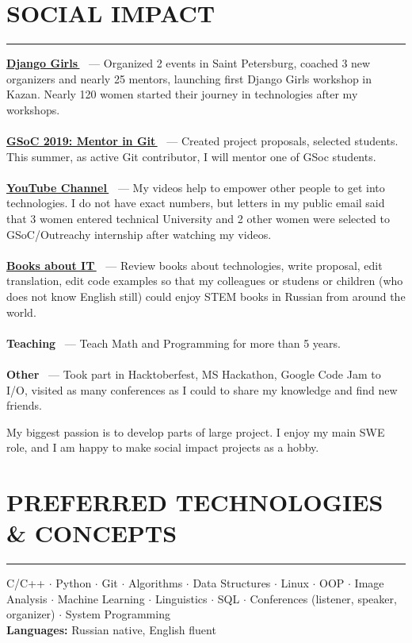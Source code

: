 \documentclass[11pt]{res} %
\let\orighref\href
\renewcommand{\href}[2]{\orighref{#1}{#2\,\faExternalLink}}
\begin{document}
\begin{resume}
\section{\uppercase{Social Impact}}
\begin{spacing}{0.3}
\textcolor[RGB]{220,220,220}{\rule{\linewidth}{0.4pt}} 
\end{spacing}
\textbf{\href{http://djangogirls.org/stpetersburg/}{Django Girls}} ~--- Organized 2 events in Saint Petersburg, coached 3 new organizers and nearly 25 mentors, launching first Django Girls workshop in Kazan. Nearly 120 women started their journey in technologies after my workshops.\\ \\
\textbf{\href{https://git.github.io/SoC-2019-Ideas/}{GSoC 2019: Mentor in Git}} ~--- Created project proposals, selected students. This summer, as active Git contributor, I will mentor one of GSoc students.\\ \\
\textbf{\href{https://www.youtube.com/programming_together/}{YouTube Channel}} ~--- My videos help to empower other people to get into technologies. I do not have exact numbers, but letters in my public email said that 3 women entered technical University and 2 other women were selected to GSoC/Outreachy internship after watching my videos.\\ \\
\textbf{\href{https://dmkpress.com/catalog/computer/}{Books about IT}} ~--- Review books about technologies, write proposal, edit translation, edit code examples so that my colleagues or studens or children (who does not know English still) could enjoy STEM books in Russian from around the world.\\ \\
\textbf{Teaching} ~--- Teach Math and Programming for more than 5 years.\\ \\
\textbf{Other} ~--- Took part in Hacktoberfest, MS Hackathon, Google Code Jam to I/O, visited as many conferences as I could to share my knowledge and find new friends. 

My biggest passion is to develop parts of large project. I enjoy my main SWE role, and I am happy to make social impact projects as a hobby.

\section{\uppercase{Preferred technologies \& concepts}}
\begin{spacing}{0.3}
\textcolor[RGB]{220,220,220}{\rule{\linewidth}{0.4pt}} 
\end{spacing}
C/C++ $\cdot$ Python $\cdot$ Git $\cdot$ Algorithms $\cdot$ Data Structures $\cdot$ Linux $\cdot$ OOP $\cdot$ Image Analysis $\cdot$ Machine Learning $\cdot$ Linguistics $\cdot$ SQL $\cdot$ Conferences (listener, speaker, organizer) $\cdot$ System Programming \\
\textbf{Languages:} Russian native, English fluent

\end{resume}
\end{document}
